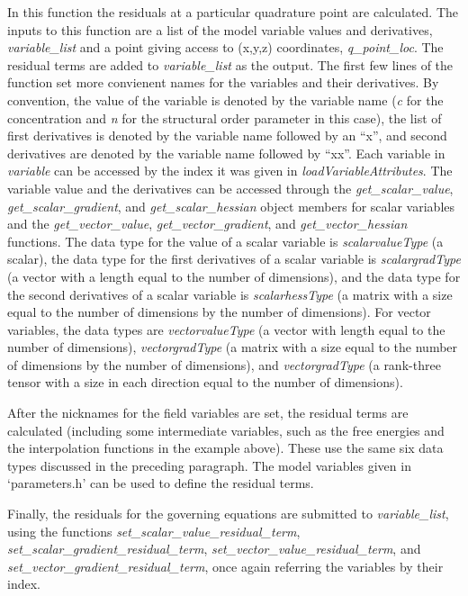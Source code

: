 \documentclass[10pt]{article} %
\begin{document}
In this function the residuals at a particular quadrature point are calculated. The inputs to this function are a list of the model variable values and derivatives, \emph{variable\_list} and a point giving access to (x,y,z) coordinates, \emph{q\_point\_loc}. The residual terms are added to \emph{variable\_list} as the output. The first few lines of the function set more convienent names for the variables and their derivatives. By convention, the value of the variable is denoted by the variable name (\emph{c} for the concentration and \emph{n} for the structural order parameter in this case), the list of first derivatives is denoted by the variable name followed by an ``x'', and second derivatives are denoted by the variable name followed by ``xx''. Each variable in \emph{variable} can be accessed by the index it was given in \emph{loadVariableAttributes}. The variable value and the derivatives can be accessed through the \emph{get\_scalar\_value},  \emph{get\_scalar\_gradient}, and \emph{get\_scalar\_hessian} object members for scalar variables and the  \emph{get\_vector\_value},  \emph{get\_vector\_gradient}, and \emph{get\_vector\_hessian} functions. The data type for the value of a scalar variable is \emph{scalarvalueType} (a scalar), the data type for the first derivatives of a scalar variable is \emph{scalargradType} (a vector with a length equal to the number of dimensions), and the data type for the second derivatives of a scalar variable is \emph{scalarhessType} (a matrix with a size equal to the number of dimensions by the number of dimensions). For vector variables, the data types are \emph{vectorvalueType} (a vector with length equal to the number of dimensions), \emph{vectorgradType} (a matrix with a size equal to the number of dimensions by the number of dimensions), and \emph{vectorgradType} (a rank-three tensor with a size in each direction equal to the number of dimensions).

After the nicknames for the field variables are set, the residual terms are calculated (including some intermediate variables, such as the free energies and the interpolation functions in the example above). These use the same six data types discussed in the preceding paragraph. The model variables given in `parameters.h' can be used to define the residual terms.

Finally, the residuals for the governing equations are submitted to \emph{variable\_list}, using the functions \emph{set\_scalar\_value\_residual\_term}, \emph{set\_scalar\_gradient\_residual\_term}, \emph{set\_vector\_value\_residual\_term}, and \emph{set\_vector\_gradient\_residual\_term}, once again referring the variables by their index.
\end{document}
